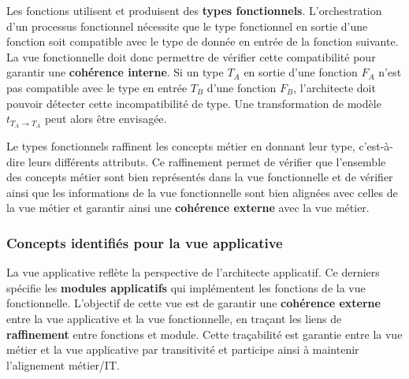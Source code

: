     Les fonctions utilisent et produisent des \textbf{types fonctionnels}. L'orchestration d'un processus fonctionnel
    nécessite que le type fonctionnel en sortie d'une fonction soit compatible avec le type de donnée
    en entrée de la fonction suivante. La vue fonctionnelle doit donc permettre de vérifier cette compatibilité
    pour garantir une \textbf{cohérence interne}.
    Si un type $ T_{A} $ en sortie d'une fonction $ F_{A} $  n'est pas compatible avec le type en entrée
    $ T_{B} $ d'une fonction $ F_{B} $, l'architecte doit pouvoir détecter cette incompatibilité de type.
    Une transformation de modèle $t_{T_{A} \rightarrow T_{A}}$ peut alors être envisagée.

    Le types fonctionnels raffinent les concepts métier en donnant leur type, c'est-à-dire leurs différents attributs.
    Ce raffinement permet de vérifier que l'ensemble des concepts métier sont bien représentés dans la vue
    fonctionnelle et de vérifier ainsi que les informations de la vue fonctionnelle sont bien alignées avec
    celles de la vue métier et garantir ainsi une \textbf{cohérence externe} avec la vue métier.

    \subsubsection{Concepts identifiés pour la vue applicative}
    La vue applicative reflète la perspective de l'architecte applicatif. Ce derniers spécifie les \textbf{modules
    applicatifs} qui implémentent les fonctions de la vue fonctionnelle.
    L'objectif de cette vue est de garantir une \textbf{cohérence externe} entre la vue applicative et la vue fonctionnelle,
    en traçant les liens de \textbf{raffinement} entre fonctions et module. Cette
    traçabilité est garantie entre la vue métier et la vue applicative par transitivité et participe ainsi
    à maintenir l'alignement métier/IT.

